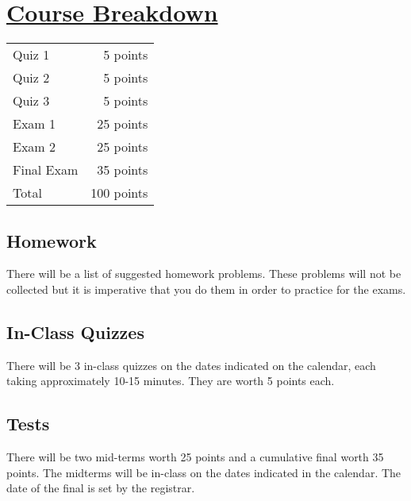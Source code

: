 \documentclass[11pt]{article}
\begin{document}
\section*{\underline{Course Breakdown}}
\begin{center}
{\renewcommand{\arraystretch}{1.2}%
\begin{tabular}{|l|r|}
\hline
Quiz 1& 5 points\\
Quiz 2& 5 points \\
Quiz 3& 5 points\\
Exam 1& 25 points\\
Exam 2& 25 points \\
Final Exam& 35 points\\
\hline 
Total & 100 points\\
\hline
\end{tabular}}
\end{center}
\subsection*{Homework}
There will be a list of suggested homework problems. These problems will not be collected but it is imperative that you do them in order to practice for the exams. 
\subsection*{In-Class Quizzes}
There will be 3 in-class quizzes on the dates indicated on the calendar, each taking approximately 10-15 minutes. They are worth 5 points each. 
\subsection*{Tests}
There will be two mid-terms worth 25 points and a cumulative final worth 35 points. The midterms will be in-class on the dates indicated in the calendar. The date of the final is set by the registrar. 
\end{document}
